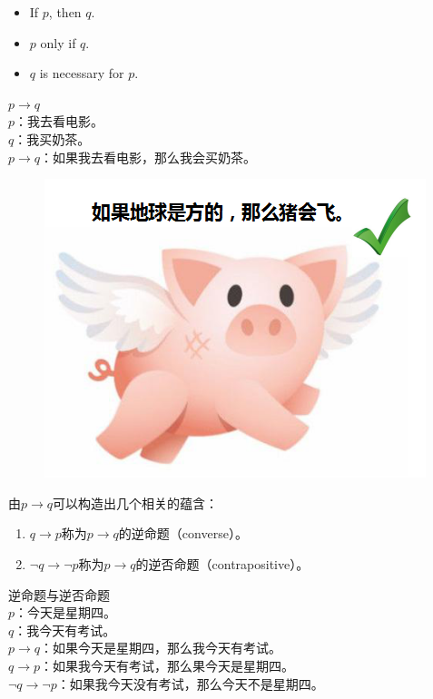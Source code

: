 \documentclass[12pt, openany, oneside]{book}
\begin{document}
\begin{itemize}
	\item If $ p $, then $ q $.
	\item $ p $ only if $ q $.
	\item $ q $ is necessary for $ p $.
\end{itemize}

\begin{tcolorbox}
	$ p \rightarrow q $ \\
	$ p $：我去看电影。 \\
	$ q $：我买奶茶。 \\
	$ p \rightarrow q $：如果我去看电影，那么我会买奶茶。
\end{tcolorbox}

\begin{figure}[H]
	\centering
	\includegraphics[scale=0.7]{img/C1/1-2/1.png}
\end{figure}

由$ p \rightarrow q $可以构造出几个相关的蕴含：

\begin{enumerate}
	\item $ q \rightarrow p $称为$ p \rightarrow q $的逆命题（converse）。
	\item $ \neg q \rightarrow \neg p $称为$ p \rightarrow q $的逆否命题（contrapositive）。
\end{enumerate}

\begin{tcolorbox}
	逆命题与逆否命题 \\
	$ p $：今天是星期四。 \\
	$ q $：我今天有考试。 \\
	$ p \rightarrow q $：如果今天是星期四，那么我今天有考试。 \\
	$ q \rightarrow p $：如果我今天有考试，那么果今天是星期四。 \\
	$ \neg q \rightarrow \neg p $：如果我今天没有考试，那么今天不是星期四。
\end{tcolorbox}
\end{document}
